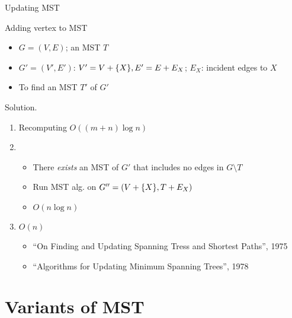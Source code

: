 \begin{frame}{Updating MST}
  \begin{exampleblock}{Adding vertex to MST }
    \begin{itemize}
      \item $G = (V,E)$; an MST $T$
      \item $G' = (V',E')$: $V' = V + \{X\}, E' = E + E_X$; $E_X$: incident
      edges to $X$
      \item To find an MST $T'$ of $G'$
    \end{itemize}
  \end{exampleblock}

  \begin{block}{Solution.}
    \begin{enumerate}
      \item Recomputing $O((m+n) \log n)$
      \item
        \begin{itemize}
          \item There \emph{exists} an MST of $G'$ that includes no edges in $G
          \setminus T$
          \item Run MST alg. on $G'' =(V + \{X\}, T + E_X)$
          \item $O(n \log n)$
        \end{itemize}
      \item $O(n)$
        \begin{itemize}
          \item ``On Finding and Updating Spanning Tress and Shortest Paths'', 1975
          \item ``Algorithms for Updating Minimum Spanning Trees'', 1978
        \end{itemize}
    \end{enumerate}
  \end{block}
\end{frame}
\section{Variants of MST}

